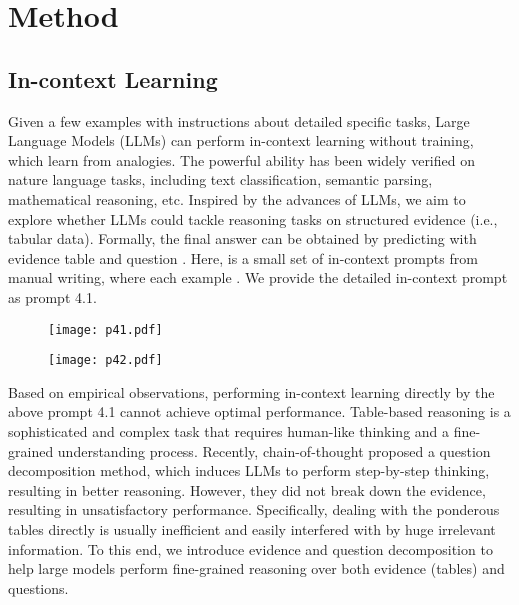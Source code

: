 \documentclass{article}
\begin{document}
\section{Method}
\subsection{In-context Learning}
Given a few examples with instructions about detailed specific tasks, Large Language Models (LLMs) can perform in-context learning without training, which learn from analogies.
The powerful ability has been widely verified on nature language tasks, including text classification, semantic parsing, mathematical reasoning, etc.
Inspired by the advances of LLMs, we aim to explore whether LLMs could tackle reasoning tasks on structured evidence (i.e., tabular data).
Formally, the final answer  can be obtained by predicting  with evidence table  and question . 
Here,  is a small set of in-context prompts from manual writing, where each example . 
We provide the detailed in-context prompt as prompt 4.1.

\begin{figure}[htbp]
\centering
\begin{minipage}[t]{0.48\textwidth}
\centering
\texttt{[image: p41.pdf]}
\end{minipage}
\begin{minipage}[t]{0.48\textwidth}
\centering
\texttt{[image: p42.pdf]}
\end{minipage}
\end{figure}


Based on empirical observations, performing in-context learning directly by the above prompt 4.1 cannot achieve optimal performance. Table-based reasoning is a sophisticated and complex task that requires human-like thinking and a fine-grained understanding process. Recently, chain-of-thought \citep{cot} proposed a question decomposition method, which induces LLMs to perform step-by-step thinking, resulting in better reasoning. 
However, they did not break down the evidence, resulting in unsatisfactory performance. Specifically, dealing with the ponderous tables directly is usually inefficient and easily interfered with by huge irrelevant information. To this end, we introduce evidence and question decomposition to help large models perform fine-grained reasoning over both evidence (tables) and questions.
\end{document}
